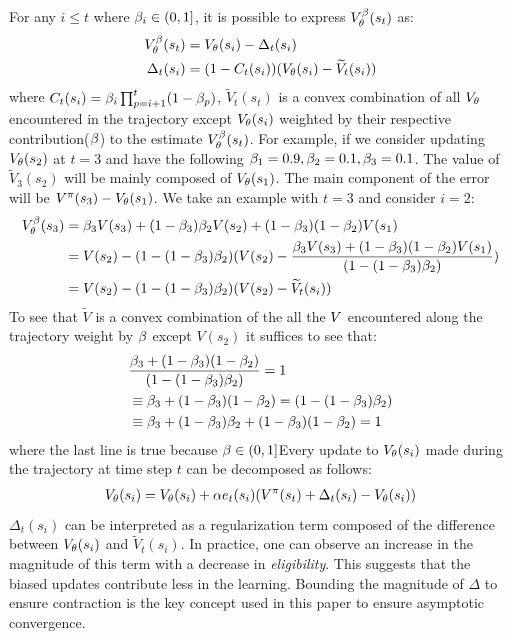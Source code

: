 For any $i \leq t$ where $\beta_i \in (0,1]$, it is possible to express $V^{\beta}_{\theta}(s_t)$ as:
\begin{equation}
\begin{split}\label{decompose}
    V^{\beta}_{\theta}(s_t) &= V_{\theta}(s_i) - \Delta_t(s_i) \\
    \Delta_t(s_i) &= (1-C_t(s_i))(V_{\theta}(s_i) - \widetilde{V}_t(s_i) ) 
\end{split}
\end{equation}
where $C_t(s_i) = \beta_i \prod_{p=i+1}^t (1-\beta_p)$, $\widetilde{V}_t(s_t)$ is a convex combination of all $V_{\theta}$ encountered in the trajectory except $V_{\theta}(s_i)$ weighted by their respective contribution($\beta$) to the estimate $V^{\beta}_{\theta}(s_t)$. For example, if we consider updating $V_{\theta}(s_2)$ at $t=3$ and have the following $\beta_1 = 0.9,\beta_2 = 0.1,\beta_3 = 0.1$. The value of $\widetilde{V}_3(s_2)$ will be mainly composed of $V_{\theta}(s_1)$. The main component of the error will be $V^{\pi}(s_3) - V_{\theta}(s_1)$. We take an example with $t=3$ and consider $i=2$:
\begin{equation}
    \begin{split}
        V^{\beta}_{\theta}(s_3) &= \beta_3 V(s_3) + (1-\beta_3)\beta_2 V(s_2) + (1-\beta_3)(1-\beta_2)  V(s_1)\\
        &= V(s_2) - (1-(1-\beta_3)\beta_2)(V(s_2) - \frac{\beta_3 V(s_3) + (1-\beta_3)(1-\beta_2)  V(s_1)}{(1-(1-\beta_3)\beta_2)})\\
        &= V(s_2) - (1-(1-\beta_3)\beta_2)(V(s_2) - \widetilde{V}_t(s_i))
    \end{split}
\end{equation}
To see that $\widetilde{V}$ is a convex combination of the all the $V$ encountered along the trajectory weight by $\beta$ except $V(s_2)$ it suffices to see that:
\begin{equation}
    \begin{split}
        & \frac{\beta_3  + (1-\beta_3)(1-\beta_2)  }{(1-(1-\beta_3)\beta_2)} = 1 \\
        &\equiv \beta_3  + (1-\beta_3)(1-\beta_2)  = (1-(1-\beta_3)\beta_2) \\
        &\equiv \beta_3 + (1-\beta_3)\beta_2 + (1-\beta_3)(1-\beta_2) = 1
    \end{split}
\end{equation}
where the last line is true because $\beta \in (0,1]$Every update to $V_{\theta}(s_i)$ made during the trajectory at time step $t$ can be decomposed as follows:
\begin{equation}
\label{decompose}
\begin{split}
    V_{\theta}(s_i) = V_{\theta}(s_i) + \alpha e_t(s_i) ( V^{\pi}(s_t) + \Delta_t(s_i) - V_{\theta}(s_i))
\end{split}
\end{equation}
$\Delta_t(s_i)$ can be interpreted as a regularization term composed of the difference between $V_{\theta}(s_i)$ and $\widetilde{V}_t(s_i)$. In practice, one can observe an increase in the magnitude of this term with a decrease in \emph{eligibility}. This suggests that the biased updates contribute less in the learning. Bounding the magnitude of $\Delta$ to ensure contraction is the key concept used in this paper to ensure asymptotic convergence.


